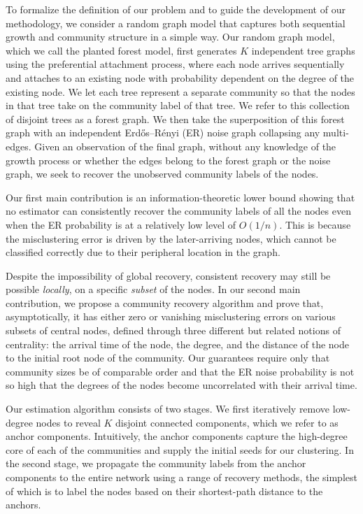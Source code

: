 \documentclass[twoside,11pt]{article}
\theoremstyle{remark}
\begin{document}
 



To formalize the definition of our problem and to guide the development of our methodology, we consider a random graph model that captures both sequential growth and community structure in a simple way. Our random graph model, which we call the planted forest model, first generates $K$ independent tree graphs using the preferential attachment process, where each node arrives sequentially and attaches to an existing node with probability dependent on the degree of the existing node. We let each tree represent a separate community so that the nodes in that tree take on the community label of that tree. We refer to this collection of disjoint trees as a forest graph. We then take the superposition of this forest graph with an independent Erd\H{o}s--R\'enyi (ER) noise graph collapsing any multi-edges. Given an observation of the final graph, without any knowledge of the growth process or whether the edges belong to the forest graph or the noise graph, we seek to recover the unobserved community labels of the nodes. 


Our first main contribution is an information-theoretic lower bound showing that no estimator can consistently recover the community labels of all the nodes even when the ER probability is at a relatively low level of $O(1/n)$. This is because the misclustering error is driven by the later-arriving nodes, which cannot be classified correctly due to their peripheral location in the graph. 

Despite the impossibility of global recovery, consistent recovery may still be possible \emph{locally}, on a specific \emph{subset} of the nodes. In our second main contribution, we propose a community recovery algorithm and prove that, asymptotically, it has either zero or vanishing misclustering errors on various subsets of central nodes, defined through three different but related notions of centrality: the arrival time of the node, the degree, and the distance of the node to the initial root node of the community. Our guarantees require only that community sizes be of comparable order and that the ER noise probability is not so high that the degrees of the nodes become uncorrelated with their arrival time. 

Our estimation algorithm consists of two stages. We first iteratively remove low-degree nodes to reveal $K$ disjoint connected components, which we refer to as anchor components. Intuitively, the anchor components capture the high-degree core of each of the communities and supply the initial seeds for our clustering. In the second stage, we propagate the community labels from the anchor components to the entire network using a range of recovery methods, the simplest of which is to label the nodes based on their shortest-path distance to the anchors. 
\end{document}
